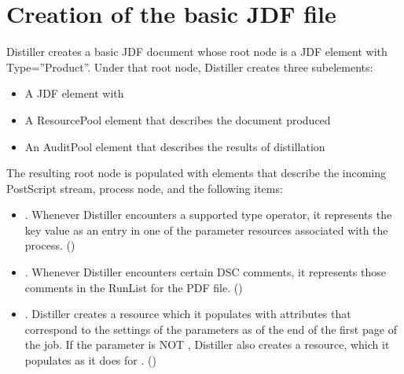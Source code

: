 \documentclass[letterpaper,12pt,english,openany,oneside]{sphinxmanual}
\begin{document}
\section{Creation of the basic JDF file}
\label{\detokenize{PDF_Create_JDF:creation-of-the-basic-jdf-file}}
Distiller creates a basic JDF document whose root node is a JDF element with Type=”Product”. Under that root node, Distiller creates three sub\sphinxhyphen{}elements:
\begin{itemize}
\item {} 
A JDF element with 

\item {} 
A ResourcePool element that describes the document produced

\item {} 
An AuditPool element that describes the results of distillation

\end{itemize}

The resulting root node is populated with elements that describe the incoming PostScript stream,  process node, and the following items:
\begin{itemize}
\item {} 
 \sphinxhyphen{}  . Whenever Distiller encounters a supported  \sphinxhyphen{}type operator, it represents the key value as an entry in one of the parameter resources associated with the  process. ()

\item {} 
 . Whenever Distiller encounters certain DSC comments, it represents those comments in the RunList for the PDF file. ()

\item {} 
 . Distiller creates a  resource which it populates with attributes that correspond to the settings of the parameters as of the end of the first page of the job. If the parameter  is NOT  , Distiller also creates a  resource, which it populates as it does for  . ()

\end{itemize}
\end{document}
